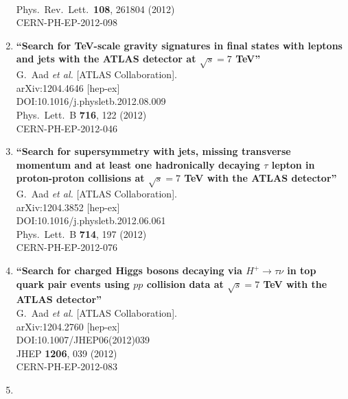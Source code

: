\documentclass{article}
\begin{document}
\begin{enumerate}
  \\{}Phys.\ Rev.\ Lett.\  {\bf 108}, 261804 (2012)
  \\{}CERN-PH-EP-2012-098
\item%
{\bf ``Search for TeV-scale gravity signatures in final states with leptons and jets with the ATLAS detector at $\sqrt{s}=7$ TeV''}
  \\{}G.~Aad {\it et al.} [ATLAS Collaboration].
  \\{}arXiv:1204.4646 [hep-ex]
  \\{}DOI:10.1016/j.physletb.2012.08.009
  \\{}Phys.\ Lett.\ B {\bf 716}, 122 (2012)
  \\{}CERN-PH-EP-2012-046
\item%
{\bf ``Search for supersymmetry with jets, missing transverse momentum and at least one hadronically decaying $\tau$ lepton in proton-proton collisions at $\sqrt{s}=7$ TeV with the ATLAS detector''}
  \\{}G.~Aad {\it et al.} [ATLAS Collaboration].
  \\{}arXiv:1204.3852 [hep-ex]
  \\{}DOI:10.1016/j.physletb.2012.06.061
  \\{}Phys.\ Lett.\ B {\bf 714}, 197 (2012)
  \\{}CERN-PH-EP-2012-076
\item%
{\bf ``Search for charged Higgs bosons decaying via $H^{+} \to \tau \nu$ in top quark pair events using $pp$ collision data at $\sqrt{s}=7$ TeV with the ATLAS detector''}
  \\{}G.~Aad {\it et al.} [ATLAS Collaboration].
  \\{}arXiv:1204.2760 [hep-ex]
  \\{}DOI:10.1007/JHEP06(2012)039
  \\{}JHEP {\bf 1206}, 039 (2012)
  \\{}CERN-PH-EP-2012-083
\item%

\end{enumerate}
\end{document}
